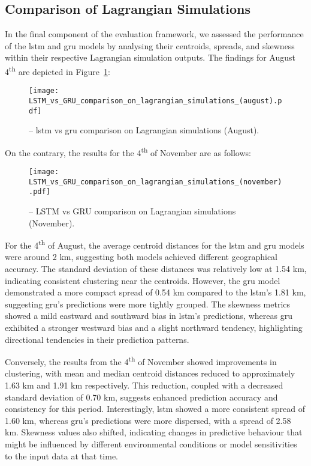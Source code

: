 \subsection{Comparison of Lagrangian Simulations}
\label{subsec:4.2.3}

In the final component of the evaluation framework, we assessed the performance of the \acrshort{lstm} and \acrshort{gru} models by analysing their centroids, spreads, and skewness within their respective Lagrangian simulation outputs. The findings for August 4\textsuperscript{th} are depicted in Figure~\ref{fig_4.6}:

\begin{figure}[htbp]
    \centering
    \texttt{[image: LSTM\_vs\_GRU\_comparison\_on\_lagrangian\_simulations\_(august).pdf]}
    \caption[LSTM vs GRU comparison on Lagrangian simulations (August).]{-- \acrshort{lstm} vs \acrshort{gru} comparison on Lagrangian simulations (August).\label{fig_4.6}}
\end{figure}
On the contrary, the results for the 4\textsuperscript{th} of November are as follows:

\begin{figure}[htbp]
    \centering
    \texttt{[image: LSTM\_vs\_GRU\_comparison\_on\_lagrangian\_simulations\_(november).pdf]}
    \caption[LSTM vs GRU comparison on Lagrangian simulations (November).]{-- LSTM vs GRU comparison on Lagrangian simulations (November).\label{fig_4.7}}
\end{figure}

For the 4\textsuperscript{th} of August, the average centroid distances for the \acrshort{lstm} and \acrshort{gru} models were around 2 km, suggesting both models achieved different geographical accuracy. The standard deviation of these distances was relatively low at 1.54 km, indicating consistent clustering near the centroids. However, the \acrshort{gru} model demonstrated a more compact spread of 0.54 km compared to the \acrshort{lstm}'s 1.81 km, suggesting \acrshort{gru}'s predictions were more tightly grouped. The skewness metrics showed a mild eastward and southward bias in \acrshort{lstm}'s predictions, whereas \acrshort{gru} exhibited a stronger westward bias and a slight northward tendency, highlighting directional tendencies in their prediction patterns.

Conversely, the results from the 4\textsuperscript{th} of November showed improvements in clustering, with mean and median centroid distances reduced to approximately 1.63 km and 1.91 km respectively. This reduction, coupled with a decreased standard deviation of 0.70 km, suggests enhanced prediction accuracy and consistency for this period. Interestingly, \acrshort{lstm} showed a more consistent spread of 1.60 km, whereas \acrshort{gru}’s predictions were more dispersed, with a spread of 2.58 km. Skewness values also shifted, indicating changes in predictive behaviour that might be influenced by different environmental conditions or model sensitivities to the input data at that time.

